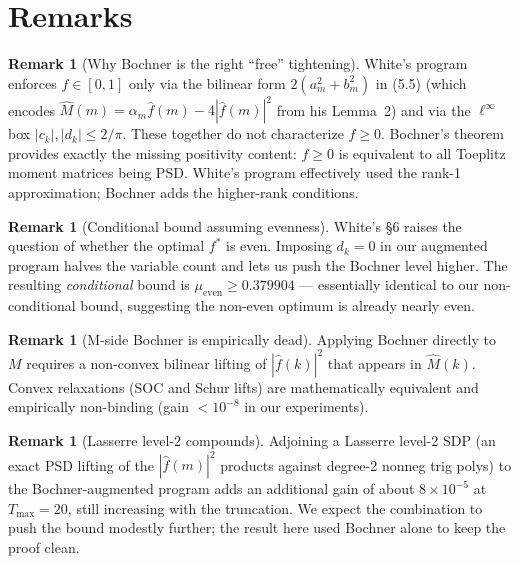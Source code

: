 \documentclass[11pt]{article}
\theoremstyle{plain}
\theoremstyle{definition}
\newtheorem{remark}[theorem]{Remark}
\begin{document}
\section{Remarks}

\begin{remark}[Why Bochner is the right ``free'' tightening]
White's program enforces $f \in [0, 1]$ only via the bilinear form
$2(a_m^2 + b_m^2)$ in (5.5) (which encodes
$\hat M(m) = \alpha_m \hat f(m) - 4|\hat f(m)|^2$ from his Lemma~2)
and via the $\ell^\infty$ box $|c_k|, |d_k| \le 2/\pi$. These together
do not characterize $f \ge 0$. Bochner's theorem provides exactly the
missing positivity content: $f \ge 0$ is equivalent to all Toeplitz
moment matrices being PSD. White's program effectively used the rank-1
approximation; Bochner adds the higher-rank conditions.
\end{remark}

\begin{remark}[Conditional bound assuming evenness]
White's \S6 raises the question of whether the optimal $f^*$ is even.
Imposing $d_k = 0$ in our augmented program halves the variable count
and lets us push the Bochner level higher. The resulting
\emph{conditional} bound is $\mu_{\text{even}} \ge 0.379904$ —
essentially identical to our non-conditional bound, suggesting the
non-even optimum is already nearly even.
\end{remark}

\begin{remark}[M-side Bochner is empirically dead]
Applying Bochner directly to $M$ requires a non-convex bilinear lifting
of $|\hat f(k)|^2$ that appears in $\hat M(k)$. Convex relaxations
(SOC and Schur lifts) are mathematically equivalent and empirically
non-binding (gain $< 10^{-8}$ in our experiments).
\end{remark}

\begin{remark}[Lasserre level-2 compounds]
Adjoining a Lasserre level-2 SDP (an exact PSD lifting of the
$|\hat f(m)|^2$ products against degree-2 nonneg trig polys) to the
Bochner-augmented program adds an additional gain of about
$8 \times 10^{-5}$ at $T_\text{max} = 20$, still increasing with the
truncation. We expect the combination to push the bound modestly
further; the result here used Bochner alone to keep the proof clean.
\end{remark}
\end{document}
